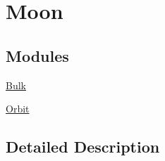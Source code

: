 \hypertarget{group___e_g_x_phys-_constants-_astrophysics-_solar_system-_moon}{}\section{Moon}
\label{group___e_g_x_phys-_constants-_astrophysics-_solar_system-_moon}
\subsection*{Modules}
\begin{DoxyCompactItemize}
\item 
\mbox{\hyperlink{group___e_g_x_phys-_constants-_astrophysics-_solar_system-_moon-_bulk}{Bulk}}
\item 
\mbox{\hyperlink{group___e_g_x_phys-_constants-_astrophysics-_solar_system-_moon-_orbit}{Orbit}}
\end{DoxyCompactItemize}


\subsection{Detailed Description}
